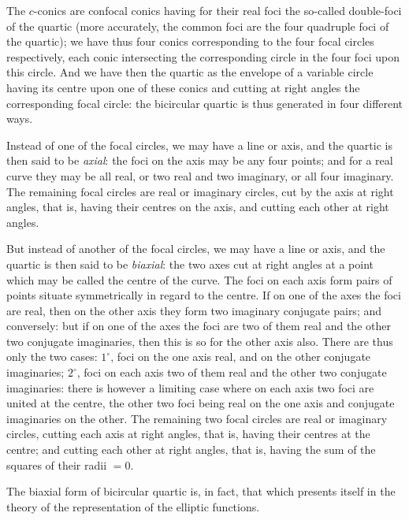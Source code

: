\documentclass[11pt,a4paper]{article}
\begin{document}
The $c$-conics are confocal conics having for their real foci the so-called double-foci of the quartic (more accurately, the common foci are the four quadruple foci of the quartic); we have thus four conics corresponding to the four focal circles respectively, each conic intersecting the corresponding circle in the four foci upon this circle. And we have then the quartic as the envelope of a variable circle having its centre upon one of these conics and cutting at right angles the corresponding focal circle: the bicircular quartic is thus generated in four different ways.

Instead of one of the focal circles, we may have a line or axis, and the quartic is then said to be \emph{axial}: the foci on the axis may be any four points; and for a real curve they may be all real, or two real and two imaginary, or all four imaginary. The remaining focal circles are real or imaginary circles, cut by the axis at right angles, that is, having their centres on the axis, and cutting each other at right angles.

But instead of another of the focal circles, we may have a line or axis, and the quartic is then said to be \emph{biaxial}: the two axes cut at right angles at a point which may be called the centre of the curve. The foci on each axis form pairs of points situate symmetrically in regard to the centre. If on one of the axes the foci are real, then on the other axis they form two imaginary conjugate pairs; and conversely: but if on one of the axes the foci are two of them real and the other two conjugate imaginaries, then this is so for the other axis also. There are thus only the two cases: $1^\circ$, foci on the one axis real, and on the other conjugate imaginaries; $2^\circ$, foci on each axis two of them real and the other two conjugate imaginaries: there is however a limiting case where on each axis two foci are united at the centre, the other two foci being real on the one axis and conjugate imaginaries on the other. The remaining two focal circles are real or imaginary circles, cutting each axis at right angles, that is, having their centres at the centre; and cutting each other at right angles, that is, having the sum of the squares of their radii $= 0$.

The biaxial form of bicircular quartic is, in fact, that which presents itself in the theory of the representation of the elliptic functions.
\end{document}
